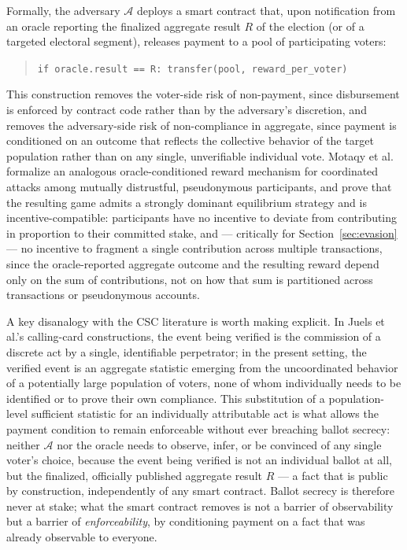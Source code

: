 \documentclass[journal,onecolumn,11pt]{IEEEtran}
\begin{document}
Formally, the adversary $\mathcal{A}$ deploys a smart contract that, upon
notification from an oracle reporting the finalized aggregate result $R$ of the
election (or of a targeted electoral segment), releases payment to a pool of
participating voters:
\begin{quote}
\texttt{if oracle.result == R: transfer(pool, reward\_per\_voter)}
\end{quote}
This construction removes the voter-side risk of non-payment, since disbursement is
enforced by contract code rather than by the adversary's discretion, and removes the
adversary-side risk of non-compliance in aggregate, since payment is conditioned on
an outcome that reflects the collective behavior of the target population rather
than on any single, unverifiable individual vote. Motaqy et al.~\cite{motaqy2021bet}
formalize an analogous oracle-conditioned reward mechanism for coordinated attacks
among mutually distrustful, pseudonymous participants, and prove that the resulting
game admits a strongly dominant equilibrium strategy and is incentive-compatible:
participants have no incentive to deviate from contributing in proportion to their
committed stake, and — critically for Section~\ref{sec:evasion} — no incentive
to fragment a single contribution across multiple transactions, since the
oracle-reported aggregate outcome and the resulting reward depend only on the sum of
contributions, not on how that sum is partitioned across transactions or
pseudonymous accounts.

A key disanalogy with the CSC literature is worth making explicit. In Juels
et al.'s calling-card constructions, the event being verified is the commission of a
discrete act by a single, identifiable perpetrator; in the present setting, the
verified event is an aggregate statistic emerging from the uncoordinated behavior of
a potentially large population of voters, none of whom individually needs to be
identified or to prove their own compliance. This substitution of a population-level sufficient statistic for an
individually attributable act is what allows the payment condition to
remain enforceable without ever breaching ballot secrecy: neither $\mathcal{A}$ nor the oracle needs to observe, infer, or be convinced of any single voter's choice, because the event being verified is not an individual ballot at all, but the finalized, officially published aggregate result $R$ --- a fact that is public by construction,
independently of any smart contract. Ballot secrecy is therefore never at stake;
what the smart contract removes is not a barrier of observability but a barrier
of \emph{enforceability}, by conditioning payment on a fact that was already
observable to everyone.
\end{document}
